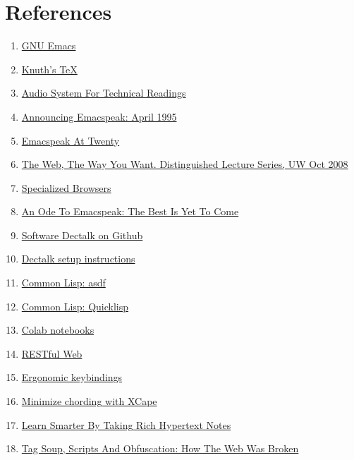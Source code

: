 \documentclass[11pt]{article}
\begin{document}
\section{References}
\label{sec:org9c2e8ea}
\begin{enumerate}
\item \href{https://www.gnu.org/s/emacs/}{GNU Emacs}
\item \href{https://en.wikipedia.org/wiki/TeX}{Knuth's \TeX{}}
\item \href{https://emacspeak.blogspot.com/2022/12/aster-spoken-math-on-emacspeak-audio\_21.html}{Audio System For Technical Readings}
\item \href{https://tvraman.github.io/emacspeak//web/releases/release-3.0.html}{Announcing Emacspeak: April 1995}
\item \href{https://emacspeak.sourceforge.net/turning-twenty.html}{Emacspeak At Twenty}
\item \href{http://www.cs.washington.edu/htbin-post/mvis/mvis?ID=636}{The Web, The Way You Want.  Distinguished Lecture Series, UW Oct 2008}
\item \href{https://emacspeak.sourceforge.net/raman/publications/specialized-browsers/}{Specialized Browsers}
\item \href{https://tvraman.github.io/emacspeak/web/01-gemini.ogg}{An Ode To Emacspeak: The Best Is Yet To Come}
\item \href{https://github.com/dectalk/dectalk.git}{Software Dectalk on Github}
\item \href{https://raw.githubusercontent.com/tvraman/emacspeak/master/servers/software-dtk/Readme.org}{Dectalk  setup instructions}
\item \href{https://asdf.common-lisp.dev/asdf.html}{Common Lisp: asdf}
\item \href{https://www.quicklisp.org/}{Common Lisp: Quicklisp}
\item \href{https://colab.research.google.com/}{Colab notebooks}
\item \href{https://en.wikipedia.org/wiki/REST}{RESTful Web}
\item \href{https://emacspeak.blogspot.com/2023/09/emacs-ergonomics-dont-punish-your.html}{Ergonomic keybindings}
\item \href{https://github.com/alols/xcape}{Minimize chording with XCape}
\item \href{https://emacspeak.blogspot.com/2022/10/learn-smarter-by-taking-rich-hypertext.html}{Learn Smarter By Taking Rich Hypertext Notes}
\item \href{https://idlewords.com/talks/website\_obesity.htm}{Tag Soup, Scripts And Obfuscation: How The Web Was Broken}

\end{enumerate}
\end{document}
